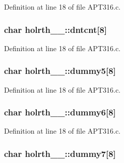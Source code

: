 Definition at line 18 of file A\+P\+T316.\+c.

\subsubsection[{\texorpdfstring{dntcnt}{dntcnt}}]{\setlength{\rightskip}{0pt plus 5cm}char holrth\+\_\+\_\+\+::dntcnt\mbox{[}8\mbox{]}}\hypertarget{structholrth__1___a7f96017a5d84883bb5030d8890abf286}{}\label{structholrth__1___a7f96017a5d84883bb5030d8890abf286}


Definition at line 18 of file A\+P\+T316.\+c.

\subsubsection[{\texorpdfstring{dummy5}{dummy5}}]{\setlength{\rightskip}{0pt plus 5cm}char holrth\+\_\+\_\+\+::dummy5\mbox{[}8\mbox{]}}\hypertarget{structholrth__1___a23ddfd00243eb067c603abd8d88df937}{}\label{structholrth__1___a23ddfd00243eb067c603abd8d88df937}


Definition at line 18 of file A\+P\+T316.\+c.

\subsubsection[{\texorpdfstring{dummy6}{dummy6}}]{\setlength{\rightskip}{0pt plus 5cm}char holrth\+\_\+\_\+\+::dummy6\mbox{[}8\mbox{]}}\hypertarget{structholrth__1___a99cfcde1b7c84a7f0884dd61320d3646}{}\label{structholrth__1___a99cfcde1b7c84a7f0884dd61320d3646}


Definition at line 18 of file A\+P\+T316.\+c.

\subsubsection[{\texorpdfstring{dummy7}{dummy7}}]{\setlength{\rightskip}{0pt plus 5cm}char holrth\+\_\+\_\+\+::dummy7\mbox{[}8\mbox{]}}\hypertarget{structholrth__1___a7d5e3afaf4f6ee04b5778491cb34b4c4}{}\label{structholrth__1___a7d5e3afaf4f6ee04b5778491cb34b4c4}


